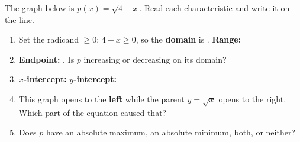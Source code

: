 \documentclass[10pt]{article}
\newcommand{\lgrid}[4]{%
  \draw[step=1, linegray!40, very thin] (#1,#3) grid (#2,#4);
  \draw[->, semithick, charcoal] (#1,0)--(#2,0) node[below right, font=\scriptsize]{$x$};
  \draw[->, semithick, charcoal] (0,#3)--(0,#4) node[left, font=\scriptsize]{$y$};}
\begin{document}
\begin{practicebox}
The graph below is $p(x) = \sqrt{4-x}$. Read each characteristic and write it on the line.
\begin{center}
\end{center}
\begin{enumerate}[leftmargin=1.7em, itemsep=3pt]
  \item Set the radicand $\ge 0$: $4-x\ge 0$, so the \textbf{domain} is \blank{3.4cm}. \quad
        \textbf{Range:} \blank{3.0cm}
  \item \textbf{Endpoint:} \blank{1.6cm}. \quad Is $p$ increasing or decreasing on its domain?
        \blank{2.4cm}
  \item \textbf{$x$-intercept:} \blank{1.6cm} \quad \textbf{$y$-intercept:} \blank{1.6cm}
  \item This graph opens to the \textbf{left} while the parent $y=\sqrt{x}$ opens to the right.
        Which part of the equation caused that? \blank{5.0cm}
  \item Does $p$ have an absolute maximum, an absolute minimum, both, or neither?
        \blank{3.4cm}
\end{enumerate}
\end{practicebox}
\end{document}
